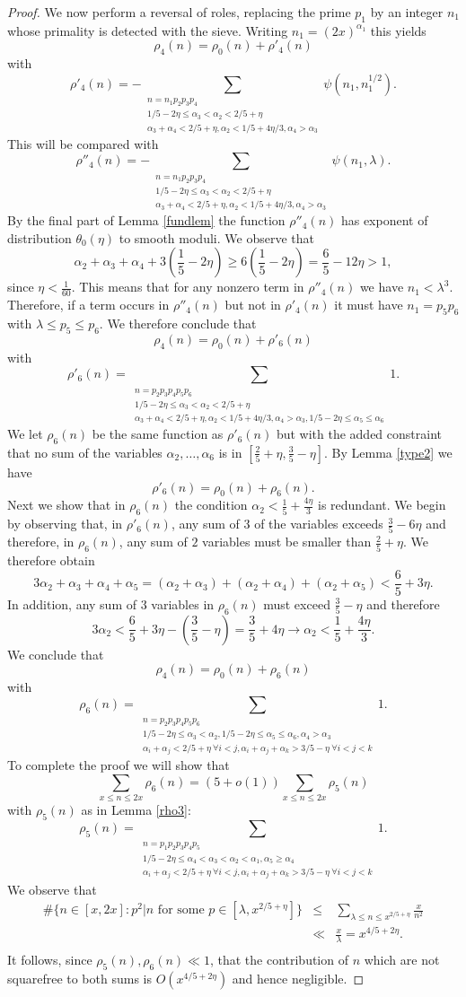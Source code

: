 \documentclass[12pt]{amsart}
\theoremstyle{plain}
\theoremstyle{definition}
\numberwithin{equation}{section}
\def \a{\alpha} \def \b{\beta} \def \d{\delta} \def \e{\varepsilon} \def \g{\gamma} \def \k{\kappa} \def \l{\lambda} \def \s{\sigma} \def \t{\theta} \def \z{\zeta}
\newcommand{\threesum}[3]{\sum_{\substack{#1\\#2\\#3}}}
\begin{document}
\begin{proof}
We now perform a reversal of roles, replacing the prime $p_1$ by an integer $n_1$ whose primality is detected with the sieve.  Writing $n_1=(2x)^{\a_1}$ this yields 
$$\rho_4(n)=\rho_0(n)+\rho'_4(n)$$
with 
$$\rho'_4(n)=-\threesum{n=n_1p_2p_3p_4}{1/5-2\eta\leq \a_3<\a_2< 2/5+\eta}{\a_3+\a_4<2/5+\eta,\a_2<1/5+4\eta/3,\a_4>\a_3}\psi(n_1,n_1^{1/2}).$$
This will be compared with 
$$\rho''_4(n)=-\threesum{n=n_1p_2p_3p_4}{1/5-2\eta\leq \a_3<\a_2< 2/5+\eta}{\a_3+\a_4<2/5+\eta,\a_2<1/5+4\eta/3,\a_4>\a_3}\psi(n_1,\l).$$
By the final part of Lemma \ref{fundlem} the function $\rho''_4(n)$ has exponent of distribution $\theta_0(\eta)$ to smooth moduli.  We observe that 
$$\a_2+\a_3+\a_4+3(\frac15-2\eta)\geq 6(\frac15-2\eta)=\frac65-12\eta>1,$$
since $\eta<\frac{1}{60}$.  This means that for any nonzero term in $\rho''_4(n)$ we have $n_1<\l^3$.  Therefore, if a term occurs in $\rho''_4(n)$ but not in $\rho'_4(n)$ it must have $n_1=p_5p_6$ with $\l\leq p_5\leq p_6$.  We therefore conclude that 
$$\rho_4(n)=\rho_0(n)+\rho'_6(n)$$
with 
$$\rho'_6(n)=\threesum{n=p_2p_3p_4p_5p_6}{1/5-2\eta\leq \a_3<\a_2< 2/5+\eta}{\a_3+\a_4<2/5+\eta,\a_2<1/5+4\eta/3,\a_4>\a_3,1/5-2\eta\leq\a_5\leq \a_6}1.$$
We let $\rho_6(n)$ be the same function as $\rho'_6(n)$ but with the added constraint that no sum of the variables $\a_2,\ldots,\a_6$ is in $[\frac25+\eta,\frac35-\eta]$.  By Lemma \ref{type2} we have 
$$\rho'_6(n)=\rho_0(n)+\rho_6(n).$$
Next we show that in $\rho_6(n)$ the condition $\a_2<\frac15+\frac{4\eta}{3}$ is redundant.  We begin by observing that, in $\rho'_6(n)$, any sum of $3$ of the variables exceeds $\frac35-6\eta$ and therefore, in $\rho_6(n)$, any sum of $2$ variables must be smaller than $\frac25+\eta$. We therefore obtain 
$$3\a_2+\a_3+\a_4+\a_5=(\a_2+\a_3)+(\a_2+\a_4)+(\a_2+\a_5)<\frac65+3\eta.$$ 
In addition, any sum of $3$ variables in $\rho_6(n)$ must exceed $\frac35-\eta$ and therefore 
$$3\a_2<\frac65+3\eta-(\frac35-\eta)=\frac35+4\eta\longrightarrow \a_2<\frac15+\frac{4\eta}{3}.$$
We conclude that 
$$\rho_4(n)=\rho_0(n)+\rho_6(n)$$
with 
$$\rho_6(n)=\threesum{n=p_2p_3p_4p_5p_6}{1/5-2\eta\leq \a_3<\a_2,1/5-2\eta\leq\a_5\leq \a_6,\a_4>\a_3}{\a_i+\a_j<2/5+\eta\ \forall i<j,\a_i+\a_j+\a_k>3/5-\eta\ \forall i<j<k}1.$$
To complete the proof we will show that 
$$\sum_{x\leq n\leq 2x}\rho_6(n)=(5+o(1))\sum_{x\leq n\leq 2x}\rho_5(n)$$
with $\rho_5(n)$ as in Lemma \ref{rho3}:
$$\rho_5(n)=\threesum{n=p_1p_2p_3p_4p_5}{1/5-2\eta\leq \a_4<\a_3<\a_2<\a_1,\a_5\geq \a_4}{\a_i+\a_j<2/5+\eta\ \forall i<j,\a_i+\a_j+\a_k>3/5-\eta\ \forall i<j<k}1.$$
We observe that 
\begin{eqnarray*}
\#\{n\in [x,2x]:p^2|n\text{ for some }p\in [\l,x^{2/5+\eta}]\}&\leq& \sum_{\l\leq n\leq x^{2/5+\eta}}\frac{x}{n^2}\\
&\ll& \frac{x}{\l}=x^{4/5+2\eta}.\\
\end{eqnarray*}
It follows, since $\rho_5(n),\rho_6(n)\ll 1$, that the contribution of $n$ which are not squarefree to both sums is $O(x^{4/5+2\eta})$ and hence negligible.  


\end{proof}
\end{document}
